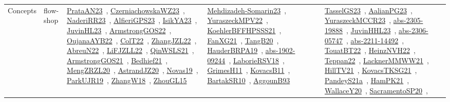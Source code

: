 {\begin{longtable}{lp{3cm}>{\raggedright\arraybackslash}p{6cm}>{\raggedright\arraybackslash}p{6cm}>{\raggedright\arraybackslash}p{8cm}}
Concepts & flow-shop & \href{articles/PrataAN23.pdf}{PrataAN23}~\cite{PrataAN23}, \href{articles/CzerniachowskaWZ23.pdf}{CzerniachowskaWZ23}~\cite{CzerniachowskaWZ23}, \href{articles/NaderiRR23.pdf}{NaderiRR23}~\cite{NaderiRR23}, \href{articles/AlfieriGPS23.pdf}{AlfieriGPS23}~\cite{AlfieriGPS23}, \href{articles/IsikYA23.pdf}{IsikYA23}~\cite{IsikYA23}, \href{papers/JuvinHL23.pdf}{JuvinHL23}~\cite{JuvinHL23}, \href{papers/ArmstrongGOS22.pdf}{ArmstrongGOS22}~\cite{ArmstrongGOS22}, \href{papers/OujanaAYB22.pdf}{OujanaAYB22}~\cite{OujanaAYB22}, \href{articles/ColT22.pdf}{ColT22}~\cite{ColT22}, \href{papers/ZhangJZL22.pdf}{ZhangJZL22}~\cite{ZhangJZL22}, \href{articles/AbreuN22.pdf}{AbreuN22}~\cite{AbreuN22}, \href{papers/LiFJZLL22.pdf}{LiFJZLL22}~\cite{LiFJZLL22}, \href{articles/QinWSLS21.pdf}{QinWSLS21}~\cite{QinWSLS21}, \href{papers/ArmstrongGOS21.pdf}{ArmstrongGOS21}~\cite{ArmstrongGOS21}, \href{articles/Bedhief21.pdf}{Bedhief21}~\cite{Bedhief21}, \href{articles/MengZRZL20.pdf}{MengZRZL20}~\cite{MengZRZL20}, \href{articles/AstrandJZ20.pdf}{AstrandJZ20}~\cite{AstrandJZ20}, \href{articles/Novas19.pdf}{Novas19}~\cite{Novas19}, \href{papers/ParkUJR19.pdf}{ParkUJR19}~\cite{ParkUJR19}, \href{articles/ZhangW18.pdf}{ZhangW18}~\cite{ZhangW18}, \href{papers/ZhouGL15.pdf}{ZhouGL15}~\cite{ZhouGL15} & \href{papers/Mehdizadeh-Somarin23.pdf}{Mehdizadeh-Somarin23}~\cite{Mehdizadeh-Somarin23}, \href{articles/YuraszeckMPV22.pdf}{YuraszeckMPV22}~\cite{YuraszeckMPV22}, \href{articles/KoehlerBFFHPSSS21.pdf}{KoehlerBFFHPSSS21}~\cite{KoehlerBFFHPSSS21}, \href{articles/FanXG21.pdf}{FanXG21}~\cite{FanXG21}, \href{papers/TangB20.pdf}{TangB20}~\cite{TangB20}, \href{articles/HauderBRPA19.pdf}{HauderBRPA19}~\cite{HauderBRPA19}, \href{articles/abs-1902-09244.pdf}{abs-1902-09244}~\cite{abs-1902-09244}, \href{articles/LaborieRSV18.pdf}{LaborieRSV18}~\cite{LaborieRSV18}, \href{papers/GrimesH11.pdf}{GrimesH11}~\cite{GrimesH11}, \href{articles/KovacsB11.pdf}{KovacsB11}~\cite{KovacsB11}, \href{articles/BartakSR10.pdf}{BartakSR10}~\cite{BartakSR10}, \href{articles/AggounB93.pdf}{AggounB93}~\cite{AggounB93} & \href{papers/TasselGS23.pdf}{TasselGS23}~\cite{TasselGS23}, \href{papers/AalianPG23.pdf}{AalianPG23}~\cite{AalianPG23}, \href{articles/YuraszeckMCCR23.pdf}{YuraszeckMCCR23}~\cite{YuraszeckMCCR23}, \href{articles/abs-2305-19888.pdf}{abs-2305-19888}~\cite{abs-2305-19888}, \href{papers/JuvinHHL23.pdf}{JuvinHHL23}~\cite{JuvinHHL23}, \href{articles/abs-2306-05747.pdf}{abs-2306-05747}~\cite{abs-2306-05747}, \href{articles/abs-2211-14492.pdf}{abs-2211-14492}~\cite{abs-2211-14492}, \href{papers/TouatBT22.pdf}{TouatBT22}~\cite{TouatBT22}, \href{articles/HeinzNVH22.pdf}{HeinzNVH22}~\cite{HeinzNVH22}, \href{papers/Teppan22.pdf}{Teppan22}~\cite{Teppan22}, \href{papers/LacknerMMWW21.pdf}{LacknerMMWW21}~\cite{LacknerMMWW21}, \href{papers/HillTV21.pdf}{HillTV21}~\cite{HillTV21}, \href{papers/KovacsTKSG21.pdf}{KovacsTKSG21}~\cite{KovacsTKSG21}, \href{articles/PandeyS21a.pdf}{PandeyS21a}~\cite{PandeyS21a}, \href{articles/HamPK21.pdf}{HamPK21}~\cite{HamPK21}, \href{articles/WallaceY20.pdf}{WallaceY20}~\cite{WallaceY20}, \href{articles/SacramentoSP20.pdf}{SacramentoSP20}~\cite{SacramentoSP20}, 
\end{longtable}}
